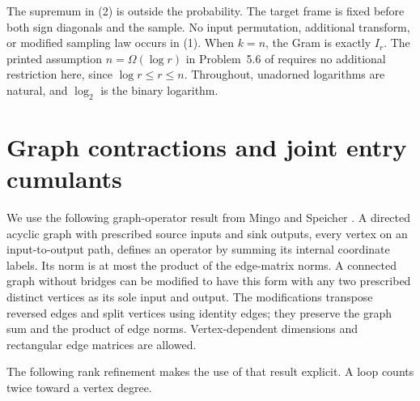 \documentclass[11pt]{article}
\theoremstyle{definition}
\begin{document}
The supremum in (2) is outside the probability. The target frame is
fixed before both sign diagonals and the sample. No input permutation,
additional transform, or modified sampling law occurs in (1).
When \(k=n\), the Gram is exactly \(I_r\).
The printed assumption \(n=\Omega(\log r)\) in Problem~5.6 of
\cite{workshop} requires no additional restriction here, since
\(\log r\le r\le n\). Throughout, unadorned logarithms are natural,
and \(\log_2\) is the binary logarithm.

\section{Graph contractions and joint entry cumulants}

We use the following graph-operator result from Mingo and Speicher
\cite[Theorem~11 and Lemma~15]{mingo}.
A directed acyclic graph with prescribed source inputs and sink outputs,
every vertex on an input-to-output path, defines an operator by summing
its internal coordinate labels. Its norm is at most the product of the
edge-matrix norms. A connected graph without bridges can be modified
to have this form with any two prescribed distinct vertices as its
sole input and output. The modifications transpose reversed edges and
split vertices using identity edges; they preserve the graph sum and
the product of edge norms. Vertex-dependent dimensions and rectangular
edge matrices are allowed.

The following rank refinement makes the use of that result explicit.
A loop counts twice toward a vertex degree.
\end{document}
